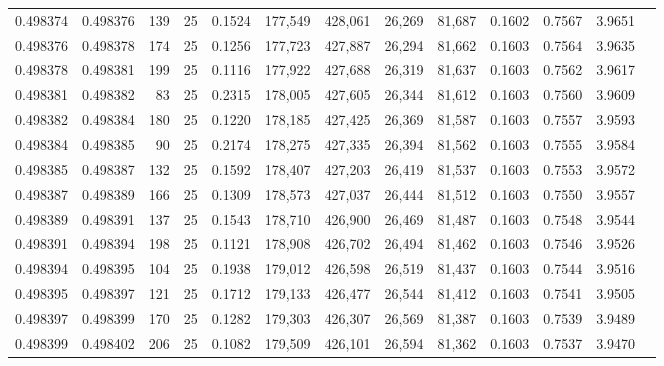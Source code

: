 \begin{tabular}{rrrrrrrrrrrrr}
0.498374 & 0.498376 & 139 &  25 &                                     0.1524 & 177,549 & 428,061 &  26,269 &  81,687 & 0.1602 & 0.7567 & 3.9651 \\
0.498376 & 0.498378 & 174 &  25 &                                     0.1256 & 177,723 & 427,887 &  26,294 &  81,662 & 0.1603 & 0.7564 & 3.9635 \\
0.498378 & 0.498381 & 199 &  25 &                                     0.1116 & 177,922 & 427,688 &  26,319 &  81,637 & 0.1603 & 0.7562 & 3.9617 \\
0.498381 & 0.498382 &  83 &  25 &                                     0.2315 & 178,005 & 427,605 &  26,344 &  81,612 & 0.1603 & 0.7560 & 3.9609 \\
0.498382 & 0.498384 & 180 &  25 &                                     0.1220 & 178,185 & 427,425 &  26,369 &  81,587 & 0.1603 & 0.7557 & 3.9593 \\
0.498384 & 0.498385 &  90 &  25 &                                     0.2174 & 178,275 & 427,335 &  26,394 &  81,562 & 0.1603 & 0.7555 & 3.9584 \\
0.498385 & 0.498387 & 132 &  25 &                                     0.1592 & 178,407 & 427,203 &  26,419 &  81,537 & 0.1603 & 0.7553 & 3.9572 \\
0.498387 & 0.498389 & 166 &  25 &                                     0.1309 & 178,573 & 427,037 &  26,444 &  81,512 & 0.1603 & 0.7550 & 3.9557 \\
0.498389 & 0.498391 & 137 &  25 &                                     0.1543 & 178,710 & 426,900 &  26,469 &  81,487 & 0.1603 & 0.7548 & 3.9544 \\
0.498391 & 0.498394 & 198 &  25 &                                     0.1121 & 178,908 & 426,702 &  26,494 &  81,462 & 0.1603 & 0.7546 & 3.9526 \\
0.498394 & 0.498395 & 104 &  25 &                                     0.1938 & 179,012 & 426,598 &  26,519 &  81,437 & 0.1603 & 0.7544 & 3.9516 \\
0.498395 & 0.498397 & 121 &  25 &                                     0.1712 & 179,133 & 426,477 &  26,544 &  81,412 & 0.1603 & 0.7541 & 3.9505 \\
0.498397 & 0.498399 & 170 &  25 &                                     0.1282 & 179,303 & 426,307 &  26,569 &  81,387 & 0.1603 & 0.7539 & 3.9489 \\
0.498399 & 0.498402 & 206 &  25 &                                     0.1082 & 179,509 & 426,101 &  26,594 &  81,362 & 0.1603 & 0.7537 & 3.9470 \\

\end{tabular}
